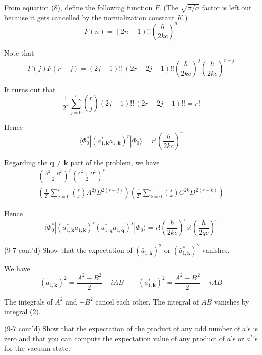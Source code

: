 \documentclass[12pt]{article}
\begin{document}
From equation (8), define the following function $F$.
(The $\sqrt{\pi/a}$ factor is left out because it gets cancelled by the normalization constant $K$.)
\begin{equation*}
F(n)=(2n-1)!!\left(\frac{\hbar}{2kc}\right)^n
\end{equation*}

Note that
\begin{equation*}
F(j)F(r-j)=
(2j-1)!!\,(2r-2j-1)!!
\left(\frac{\hbar}{2kc}\right)^j
\left(\frac{\hbar}{2kc}\right)^{r-j}
\end{equation*}

It turns out that
\begin{equation*}
\frac{1}{2^r}\sum_{j=0}^r\binom{r}{j}(2j-1)!!\,(2r-2j-1)!!=r!
\end{equation*}

Hence
\begin{equation*}
\langle\Phi_0^*|(\bar a_{1,\mathbf k}^*\bar a_{1,\mathbf k})^r|\Phi_0\rangle
=r!\left(\frac{\hbar}{2kc}\right)^r
\end{equation*}

Regarding the $\mathbf q\ne\mathbf k$ part of the problem, we have
\begin{multline*}
\left(\frac{A^2+B^2}{2}\right)^r\left(\frac{C^2+D^2}{2}\right)^s={}
\\
\left(\frac{1}{2^r}\sum_{j=0}^r\binom{r}{j}A^{2j}B^{2(r-j)}\right)
\left(\frac{1}{2^s}\sum_{k=0}^s\binom{s}{k}C^{2k}D^{2(r-k)}\right)
\end{multline*}

Hence
\begin{equation*}
\langle\Phi_0^*|
(\bar a_{1,\mathbf k}^*\bar a_{1,\mathbf k})^r
(\bar a_{1,\mathbf q}^*\bar a_{1,\mathbf q})^s
|\Phi_0\rangle
=r!\left(\frac{\hbar}{2kc}\right)^r
s!\left(\frac{\hbar}{2qc}\right)^s
\end{equation*}

(9-7 cont'd)
Show that the expectation of 
$(\bar a_{1,\mathbf k})^2$ or
$(\bar a_{1,\mathbf k}^*)^2$ vanishes.

\bigskip
We have
\begin{equation*}
(\bar a_{1,\mathbf k})^2=\frac{A^2-B^2}{2}-iAB
\qquad
(\bar a_{1,\mathbf k}^*)^2=\frac{A^2-B^2}{2}+iAB
\end{equation*}

The integrals of $A^2$ and $-B^2$ cancel each other.
The integral of $AB$ vanishes by integral (2).

\bigskip
(9-7 cont'd)
Show that the expectation of the product of any odd number of
$\bar a$'s is zero and that you can compute the expectation value of
any product of $\bar a$'s or $\bar a^*$'s for the vacuum state.

\end{document}
